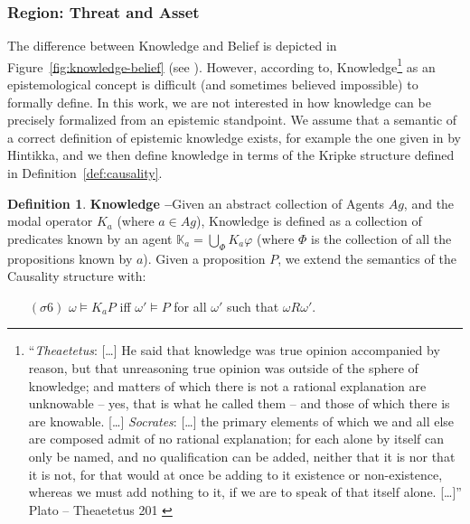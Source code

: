 \documentclass{article}
\theoremstyle{definition}
\newtheorem{definition}{Definition}[section]
\theoremstyle{corollary}
\theoremstyle{lemma}
\theoremstyle{theorem}
\theoremstyle{theorem}
\newcommand{\modalrelation}{R}
\newcommand{\world}{\omega}
\newcommand{\interpretation}{\sigma}
\newcommand{\knowledge}[1]{\mathbb{K}_{#1}}
\newcommand{\knows}[2]{K_{#1}#2}
\begin{document}
\subsubsection{Region: Threat and Asset}\label{sec:threatasset}
The difference between Knowledge and Belief is depicted in
Figure~\ref{fig:knowledge-belief} (see \autocite{wiki-knowledgebelief}).  However,
according to\autocite{Gettier2012knowledge},
Knowledge\footnote{``\emph{Theaetetus}: [\ldots] He said that knowledge was
true opinion accompanied by reason, but that unreasoning true opinion was
outside of the sphere of knowledge; and matters of which there is not a
rational explanation are unknowable -- yes, that is what he called them -- and
those of which there is are knowable. [\ldots] \emph{Socrates}: [\ldots] the
primary elements of which we and all else are composed admit of no rational
explanation; for each alone by itself can only be named, and no qualification
can be added, neither that it is nor that it is not, for that would at once be
adding to it existence or non-existence, whereas we must add nothing to it, if
we are to speak of that itself alone.  [\ldots]'' Plato -- Theaetetus 201
\autocite{Plato1914Plato}} as an epistemological concept is difficult (and
sometimes believed impossible\autocite{citation}) to formally define. In this
work, we are not interested in 
how knowledge can be precisely formalized from an epistemic standpoint. 
We assume that a semantic of a correct definition of epistemic knowledge exists,
for example the one given in\autocite{Hintikka1962knwoledge} by Hintikka, and we then define 
knowledge in terms of the Kripke structure defined in Definition~\ref{def:causality}.

\begin{definition}{\bf Knowledge --}\label{def:knowledge}
Given an abstract collection of Agents $Ag$, and the modal operator
	$\knows{a}{}$ (where $a\in Ag$), Knowledge is defined as a collection
	of predicates known by an agent $\knowledge{a}=\bigcup_\Phi \knows{a}{\varphi}$ 
	(where $\Phi$ is the collection of all the propositions known by $a$).
	Given a proposition $P$, we extend the semantics of the Causality structure with:
	\begin{enumerate}[noitemsep]
		\item[$(\interpretation6)$] $\world\models\knows{a}{P}$ iff
			$\world'\models P$ for all $\world'$ such that
			$\world\modalrelation\world'$.
	\end{enumerate}
\end{definition}
\end{document}
